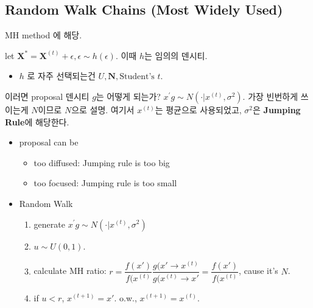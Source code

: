 \documentclass[
]{book}
\providecommand{\tightlist}{%
  \setlength{\itemsep}{0pt}\setlength{\parskip}{0pt}}
\begin{document}
\hypertarget{random-walk-chains-most-widely-used}{%
\subsection{Random Walk Chains (Most Widely Used)}\label{random-walk-chains-most-widely-used}}

MH method 에 해당.

let \(\textbf {X}^{\ast} = \textbf {X}^{(t)} + \epsilon , \epsilon \sim h(\epsilon )\). 이때 \(h\)는 임의의 덴시티.

\begin{itemize}
\tightlist
\item
  \(h\) 로 자주 선택되는건 \(U, \textbf{N}, \text {Student's } t\).
\end{itemize}

이러면 proposal 덴시티 \(g\)는 어떻게 되는가? \(x^{'} g \sim N( \cdot \rvert x^{(t)}, \sigma^2 )\). 가장 빈번하게 쓰이는게 \(N\)이므로 \(N\)으로 설명. 여기서 \(x^{(t)}\)는 평균으로 사용되었고, \(\sigma^2\)은 \textbf{Jumping Rule}에 해당한다.

\begin{itemize}
\tightlist
\item
  proposal can be

  \begin{itemize}
  \tightlist
  \item
    too diffused: Jumping rule is too big
  \item
    too focused: Jumping rule is too small
  \end{itemize}
\item
  Random Walk

  \begin{enumerate}
  \def\labelenumi{\arabic{enumi}.}
  \tightlist
  \item
    generate \(x^{'} g \sim N( \cdot \rvert x^{(t)}, \sigma^2 )\)
  \item
    \(u \sim U(0,1)\).
  \item
    calculate MH ratio: \(r = \dfrac {f(x')}{f(x^{(t)}} \dfrac {g(x' \rightarrow x^{(t)}} {g(x^{(t)} \rightarrow x'} = \dfrac {f(x')}{f(x^{(t)}}\), cause it's \(N\).
  \item
    if \(u<r\), \(x^{(t+1)} = x'\). o.w., \(x^{(t+1)} = x^(t)\).
  \end{enumerate}
\end{itemize}

~\\
~\\
\end{document}
